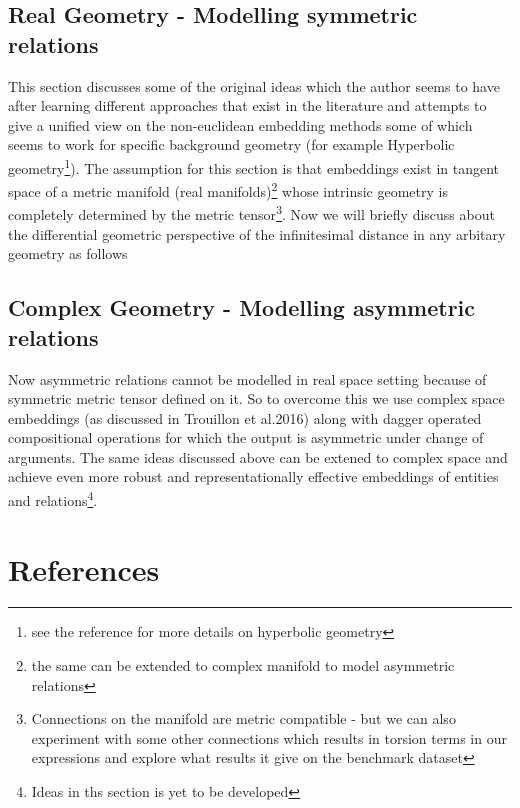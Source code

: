 \documentclass[12pt]{article}
\begin{document}
\subsection{Real Geometry - Modelling symmetric relations}
This section discusses some of the original ideas which the author seems to have after learning different approaches that exist in the literature and attempts to give a unified view on the non-euclidean embedding methods some of which seems to work for specific background geometry (for example Hyperbolic geometry\footnote{see the reference for more details on hyperbolic geometry}). The assumption for this section is that embeddings exist in tangent space of a metric manifold (real manifolds)\footnote{the same can be extended to complex manifold to model asymmetric relations} whose intrinsic geometry is completely determined by the metric tensor\footnote{Connections on the manifold are metric compatible - but we can also experiment with some other connections which results in torsion terms in our expressions and explore what results it give on the benchmark dataset}. Now we will briefly discuss about the differential geometric perspective of the infinitesimal distance in any arbitary geometry as follows

\subsection{Complex Geometry - Modelling asymmetric relations}
Now asymmetric relations cannot be modelled in real space setting because of symmetric metric tensor defined on it. So to overcome this we use complex space embeddings (as discussed in Trouillon et al.2016) along with dagger operated compositional operations for which the output is asymmetric under change of arguments. The same ideas discussed above can be extened to complex space and achieve even more robust and representationally effective embeddings of entities and relations\footnote{Ideas in ths section is yet to be developed}.

\section{References}


\end{document}

